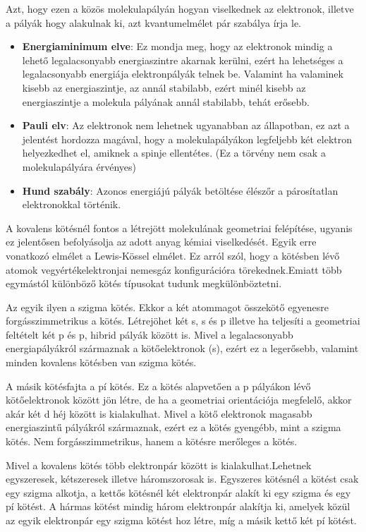 \documentclass[colorlinks]{thesis-ekf}
\theoremstyle{definition}
\theoremstyle{remark}
\begin{document}
 Azt, hogy ezen a közös molekulapályán hogyan viselkednek az elektronok, illetve a pályák hogy alakulnak ki, azt kvantumelmélet pár szabálya írja le. \cite{miskolc_kemia}
 \begin{itemize}
 	\item \textbf{Energiaminimum elve}: Ez mondja meg, hogy az elektronok mindig a lehető legalacsonyabb energiaszintre akarnak kerülni, ezért ha lehetséges a legalacsonyabb energiája elektronpályák telnek be. Valamint ha valaminek kisebb az energiaszintje, az annál stabilabb, ezért minél kisebb az energiaszintje a molekula pályának annál stabilabb, tehát erősebb. \cite{miskolc_kemia}
 	\item \textbf{Pauli elv}: Az elektronok nem lehetnek ugyanabban az állapotban, ez azt a jelentést hordozza magával, hogy a molekulapályákon legfeljebb két elektron helyezkedhet el, amiknek a spinje ellentétes.\cite{miskolc_kemia} (Ez a törvény nem csak a molekulapályára érvényes)
 	\item \textbf{Hund szabály}: Azonos energiájú pályák betöltése élészőr a párosítatlan elektronokkal történik. \cite{miskolc_kemia}
 \end{itemize}

A kovalens kötésnél fontos a létrejött molekulának geometriai felépítése, ugyanis ez jelentősen befolyásolja az adott anyag kémiai viselkedését. Egyik erre vonatkozó elmélet a Lewis-Kössel elmélet. Ez arról szól, hogy a kötésben lévő atomok vegyértékelektronjai nemesgáz konfigurációra törekednek.Emiatt több egymástól különböző kötés típusokat tudunk megkülönböztetni.

Az egyik ilyen a szigma kötés. Ekkor a két atommagot összekötő egyenesre forgásszimmetrikus a kötés. Létrejöhet két s, s és p illetve ha teljesíti a geometriai feltételt két p és p, hibrid pályák között is. Mivel a legalacsonyabb energiapályákról származnak a kötőelektronok (s), ezért ez a legerősebb, valamint minden kovalens kötésben van szigma kötés.

A másik kötésfajta a pí kötés. Ez a kötés alapvetően a p pályákon lévő kötőelektronok között jön létre, de ha a geometriai orientációja megfelelő, akkor akár két d héj között is kialakulhat. Mivel a kötő elektronok magasabb energiaszintű pályákról származnak, ezért ez a kötés gyengébb, mint a szigma kötés.\cite{miskolc_kemia} Nem forgásszimmetrikus, hanem a kötésre merőleges a kötés.\cite{eke_kemia_ppt}

Mivel a kovalens kötés több elektronpár között is kialakulhat.Lehetnek egyszeresek, kétszeresek illetve háromszorosak is. Egyszeres kötésnél a kötést csak egy szigma alkotja, a kettős kötésnél két elektronpár alakít ki egy szigma és egy pí kötést. A hármas kötést mindig három elektronpár alakítja ki, amelyek közül az egyik elektronpár egy szigma kötést hoz létre, míg a másik kettő két pí kötést.\cite{eke_kemia_ppt}
\end{document}
